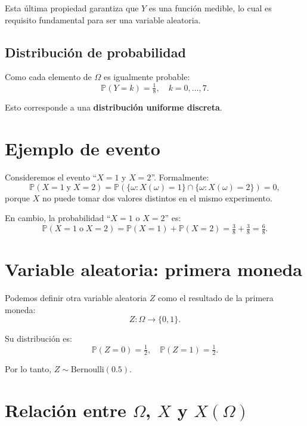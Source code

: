 \documentclass[12pt]{article}
\begin{document}
Esta última propiedad garantiza que $Y$ es una función medible, lo cual es requisito fundamental para ser una variable aleatoria.

\subsection{Distribución de probabilidad}

Como cada elemento de $\Omega$ es igualmente probable:
\begin{equation*}
\mathbb{P}(Y=k) = \tfrac{1}{8}, \quad k=0,\dots,7.
\end{equation*}

Esto corresponde a una \textbf{distribución uniforme discreta}.

\section{Ejemplo de evento}

Consideremos el evento ``$X=1$ y $X=2$''. Formalmente:
\begin{equation*}
\mathbb{P}(X=1 \; \text{y} \; X=2) = \mathbb{P}(\{\omega : X(\omega)=1\} \cap \{\omega : X(\omega)=2\}) = 0,
\end{equation*}
porque $X$ no puede tomar dos valores distintos en el mismo experimento.

En cambio, la probabilidad ``$X=1$ o $X=2$'' es:
\begin{equation*}
\mathbb{P}(X=1 \; \text{o} \; X=2) = \mathbb{P}(X=1) + \mathbb{P}(X=2) = \tfrac{3}{8} + \tfrac{3}{8} = \tfrac{6}{8}.
\end{equation*}

\section{Variable aleatoria: primera moneda}

Podemos definir otra variable aleatoria $Z$ como el resultado de la primera
moneda:
\begin{equation*}
Z : \Omega \to \{0,1\}.
\end{equation*}

Su distribución es:
\begin{equation*}
\mathbb{P}(Z=0) = \tfrac{1}{2}, \quad \mathbb{P}(Z=1) = \tfrac{1}{2}.
\end{equation*}

Por lo tanto, $Z \sim \text{Bernoulli}(0.5)$.

\section{Relación entre $\Omega$, $X$ y $X(\Omega)$}
\end{document}
